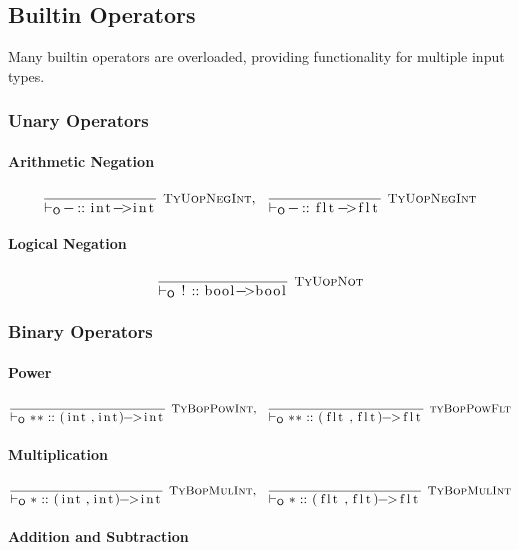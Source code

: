 \documentclass{article}
\newcommand{\code}[1]{\lstinline[columns=fixed]{#1}}
\newcommand{\drmrule}[5]{\frac{#1}{#2\vdash_{\mathsf{#3}}#4}\textsc{\ \small{#5}}}
\newcommand{\mc}[1]{\textnormal{\code{#1}}}
\newcommand{\subsubsubsection}{\paragraph}
\begin{document}
		\subsection{Builtin Operators}
		
			Many builtin operators are overloaded, providing functionality for multiple input types.
			
			\subsubsection{Unary Operators}
			
				\subsubsubsection{Arithmetic Negation}
				
					\begin{align*}
						\drmrule{}{}{O}{\mc{-} :: \mc{int->int}}{TyUopNegInt},\ \ 
						\drmrule{}{}{O}{\mc{-} :: \mc{flt->flt}}{TyUopNegInt}
					\end{align*}
				
				\subsubsubsection{Logical Negation}

					\begin{align*}
						\drmrule{}{}{O}{\mc{!} :: \mc{bool->bool}}{TyUopNot}
					\end{align*}
			
			\subsubsection{Binary Operators}
			
				\subsubsubsection{Power}
				
					\begin{align*}
						\drmrule{}{}{O}{\mc{**} :: \mc{(int,int)->int}}{TyBopPowInt},\ \ 
						\drmrule{}{}{O}{\mc{**} :: \mc{(flt,flt)->flt}}{tyBopPowFlt}
					\end{align*}
				
				\subsubsubsection{Multiplication}
				
					\begin{align*}
						\drmrule{}{}{O}{\mc{*} :: \mc{(int,int)->int}}{TyBopMulInt},\ \ 
						\drmrule{}{}{O}{\mc{*} :: \mc{(flt,flt)->flt}}{TyBopMulInt}
					\end{align*}
				
				\subsubsubsection{Addition and Subtraction}
				
\end{document}
